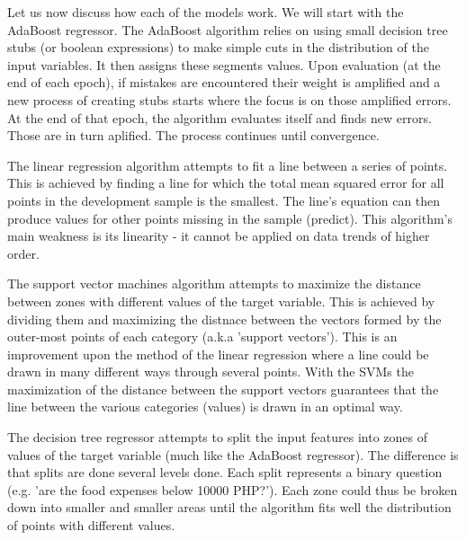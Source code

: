 \documentclass{article}
\begin{document}
Let us now discuss how each of the models work. We will start with the AdaBoost regressor. The AdaBoost algorithm relies on using small decision tree stubs (or boolean expressions) to make simple cuts in the distribution of the input variables. It then assigns these segments values. Upon evaluation (at the end of each epoch), if mistakes are encountered their weight is amplified and a new process of creating stubs starts where the focus is on those amplified errors. At the end of that epoch, the algorithm evaluates itself and finds new errors. Those are in turn aplified. The process continues until convergence.

The linear regression algorithm attempts to fit a line between a series of points. This is achieved by finding a line for which the total mean squared error for all points in the development sample is the smallest. The line's equation can then produce values for other points missing in the sample (predict). This algorithm's main weakness is its linearity - it cannot be applied on data trends of higher order.

The support vector machines algorithm attempts to maximize the distance between zones with different values of the target variable. This is achieved by dividing them and maximizing the distnace between the vectors formed by the outer-most points of each category (a.k.a 'support vectors'). This is an improvement upon the method of the linear regression where a line could be drawn in many different ways through several points. With the SVMs the maximization of the distance between the support vectors guarantees that the line between the various categories (values) is drawn in an optimal way.

The decision tree regressor attempts to split the input features into zones of values of the target variable (much like the AdaBoost regressor). The difference is that splits are done several levels done. Each split represents a binary question (e.g. 'are the food expenses below 10000 PHP?'). Each zone could thus be broken down into smaller and smaller areas until the algorithm fits well the distribution of points with different values.
\end{document}
